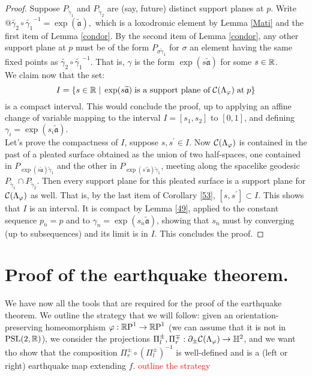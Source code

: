 \begin{proof}
Suppose $P_{\widetilde{\gamma}_1}$ and $P_{\widetilde{\gamma}_2}$ are (say, future) distinct support planes at $p$. Write $ @\widetilde{\gamma_2}\circ\widetilde{\gamma_1}^{-1}=\exp(\widetilde{\mathfrak{a}}),$ which is a loxodromic element by Lemma \ref{Mati} and the first item of Lemma \ref{condor}. By the second item of Lemma \ref{condor}, any other support plane at $p$ must be of the form $P_{\sigma\widetilde{\gamma}_1}$ for $\sigma$ an element having the same fixed points as $\widetilde{\gamma_2}\circ\widetilde{\gamma_1}^{-1}$. That is, $\gamma$ is the form $\exp(s\widetilde{\mathfrak{a}})$ for some $s\in\R$.\\
We claim now that the set: 
\[
    I=\{s\in\R\;|\;\exp(s\widetilde{\mathfrak{a}})\;\text{is a support plane of}\;\CF\;\text{at}\;p\}
\]
is a compact interval. This would conclude the proof, up to applying an affine change of variable mapping to the interval $I=[s_1,s_2]$ to $[0,1]$, and defining $\gamma_i=\exp(s_i\widetilde{\mathfrak{a}}).$\\
Let's prove the compactness of $I$, suppose $s,s^{\prime} \in I$. Now $\CF$ is contained in the past of a pleated surface obtained as the union of two half-spaces, one contained in $P_{\exp(s\widetilde{\mathfrak{a}})\widetilde{\gamma}_1}$ and the other in $P_{\exp(s^{\prime}\widetilde{\mathfrak{a}})\widetilde{\gamma}_1}$, meeting along the spacelike geodesic $P_{\widetilde{\gamma}_1}\cap P_{\widetilde{\gamma}_2}$. Then every support plane for this pleated surface is a support plane for $\CF$ as well. That is, by the last item of Corollary \ref{53}, $[s,s^{\prime}]\subset I$. This shows that $I$ is an interval. It is compact by Lemma \ref{49}, applied to the constant sequence $p_n=p$ and to $\gamma_n=\exp(s_n\widetilde{\mathfrak{a}})$, showing that $s_n$ must by converging (up to subsequences) and its limit is in $I$. This concludes the proof.  

\end{proof}

\section{Proof of the earthquake theorem.}

We have now all the tools that are required for the proof of the earthquake theorem. We outline the strategy that we will follow: given an orientation-preserving homeomorphism $\varphi:\S\to\S$ (we can assume that it is not in $\PSL$), we consider the projections $\Pi_l^\pm,\Pi_r^\mp:\partial_\pm\CF\to\H^2$, and we want tho show that the composition $\Pi_r^\pm\circ(\Pi_l^\pm)^{-1}$  is well-defined and is a (left or right) earthquake map extending $f$. \textcolor{red}{outline the strategy}

